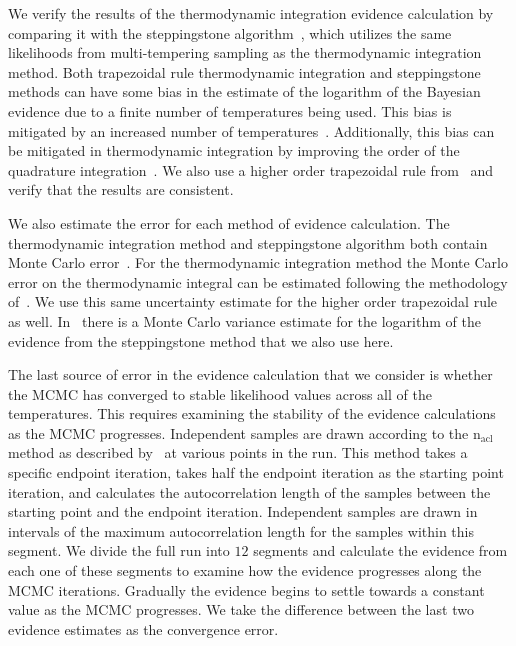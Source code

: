 We verify the results of the thermodynamic integration evidence calculation by comparing it with the steppingstone algorithm~\citep{xie2010improving}, which utilizes the same likelihoods from multi-tempering sampling as the thermodynamic integration method. Both trapezoidal rule thermodynamic integration and steppingstone methods can have some bias in the estimate of the logarithm of the Bayesian evidence due to a finite number of temperatures being used. This bias is mitigated by an increased number of temperatures~\citep{xie2010improving, Russel:2018pqv}. Additionally, this bias can be mitigated in thermodynamic integration by improving the order of the quadrature integration~\citep{friel2014improving}. We also use a higher order trapezoidal rule from~\cite{friel2014improving} and verify that the results are consistent.

We also estimate the error for each method of evidence calculation. The thermodynamic integration method and steppingstone algorithm both contain Monte Carlo error~\citep{annis2019thermodynamic}. For the thermodynamic integration method the Monte Carlo error on the thermodynamic integral can be estimated following the methodology of~\cite{annis2019thermodynamic}. We use this same uncertainty estimate for the higher order trapezoidal rule as well. In~\cite{xie2010improving} there is a Monte Carlo variance estimate for the logarithm of the evidence from the steppingstone method that we also use here.

The last source of error in the evidence calculation that we consider is whether the MCMC has converged to stable likelihood values across all of the temperatures. This requires examining the stability of the evidence calculations as the MCMC progresses. Independent samples are drawn according to the $\mathrm{n_{acl}}$ method as described by~\cite{biwer2019pycbc} at various points in the run. This method takes a specific endpoint iteration, takes half the endpoint iteration as the starting point iteration, and calculates the autocorrelation length of the samples between the starting point and the endpoint iteration. Independent samples are drawn in intervals of the maximum autocorrelation length for the samples within this segment. We divide the full run into $12$ segments and calculate the evidence from each one of these segments to examine how the evidence progresses along the MCMC iterations. Gradually the evidence begins to settle towards a constant value as the MCMC progresses. We take the difference between the last two evidence estimates as the convergence error.

